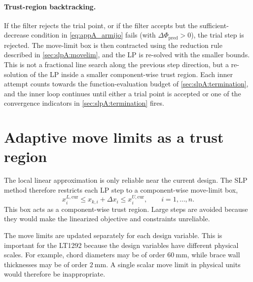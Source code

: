 \paragraph{Trust-region backtracking.}

If the filter rejects the trial point, or if the filter accepts but
the sufficient-decrease condition in \autoref{eq:appA_armijo} fails
(with $\Delta\Phi_{\mathrm{pred}}>0$), the trial step is rejected.
The move-limit box is then contracted using the reduction rule
described in \autoref{sec:slpA:movelim}, and the LP is re-solved with
the smaller bounds. This is not a fractional line search along the
previous step direction, but a re-solution of the LP inside a smaller
component-wise trust region. Each inner attempt counts towards the
function-evaluation budget of \autoref{sec:slpA:termination}, and the
inner loop continues until either a trial point is accepted or one of
the convergence indicators in \autoref{sec:slpA:termination} fires.

\section{Adaptive move limits as a trust region}
\label{sec:slpA:movelim}

The local linear approximation is only reliable near the current
design. The SLP method therefore restricts each LP step to a
component-wise move-limit box,
\begin{equation}
\label{eq:appA_move_box}
    x_i^{L,\mathrm{cur}}
    \leq
    x_{k,i} + \Delta x_i
    \leq
    x_i^{U,\mathrm{cur}}, \qquad i = 1,\dots,n .
\end{equation}
This box acts as a component-wise trust region. Large steps are
avoided because they would make the linearized objective and
constraints unreliable.

The move limits are updated separately for each design variable. This
is important for the LT1292 because the design variables have
different physical scales. For example, chord diameters may be of
order $60~\mathrm{mm}$, while brace wall thicknesses may be of order
$2~\mathrm{mm}$. A single scalar move limit in physical units would
therefore be inappropriate.

